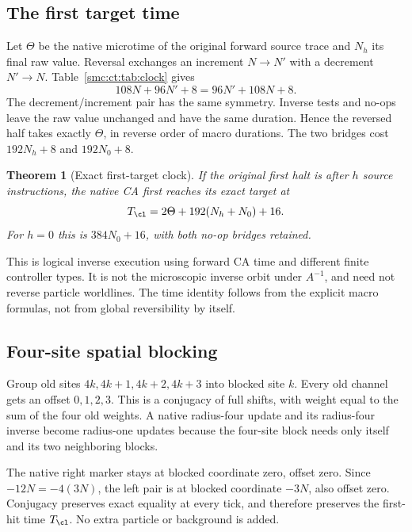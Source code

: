 \documentclass[11pt,letterpaper]{article}
\numberwithin{equation}{section}
\newtheorem{theorem}{Theorem}[section]
\theoremstyle{definition}
\theoremstyle{remark}
\begin{document}
\subsection{The first target time}

Let $\Theta$ be the native microtime of the original forward source trace and $N_h$ its final raw value. Reversal exchanges an increment $N\to N'$ with a decrement $N'\to N$. Table~\ref{smc:ct:tab:clock} gives
\[
108N+96N'+8=96N'+108N+8.
\]
The decrement/increment pair has the same symmetry. Inverse tests and no-ops leave the raw value unchanged and have the same duration. Hence the reversed half takes exactly $\Theta$, in reverse order of macro durations. The two bridges cost $192N_h+8$ and $192N_0+8$.

\begin{theorem}[Exact first-target clock]\label{smc:ct:thm:clock}
If the original first halt is after $h$ source instructions, the native CA first reaches its exact target at
\begin{equation}\label{smc:ct:eq:cleanclock}
T_{\cl}=2\Theta+192(N_h+N_0)+16.
\end{equation}
For $h=0$ this is $384N_0+16$, with both no-op bridges retained.
\end{theorem}

This is logical inverse execution using forward CA time and different finite controller types. It is not the microscopic inverse orbit under $A^{-1}$, and need not reverse particle worldlines. The time identity follows from the explicit macro formulas, not from global reversibility by itself.

\subsection{Four-site spatial blocking}

Group old sites $4k,4k+1,4k+2,4k+3$ into blocked site $k$. Every old channel gets an offset $0,1,2,3$. This is a conjugacy of full shifts, with weight equal to the sum of the four old weights. A native radius-four update and its radius-four inverse become radius-one updates because the four-site block needs only itself and its two neighboring blocks.

The native right marker stays at blocked coordinate zero, offset zero. Since $-12N=-4(3N)$, the left pair is at blocked coordinate $-3N$, also offset zero. Conjugacy preserves exact equality at every tick, and therefore preserves the first-hit time $T_{\cl}$. No extra particle or background is added.
\end{document}
